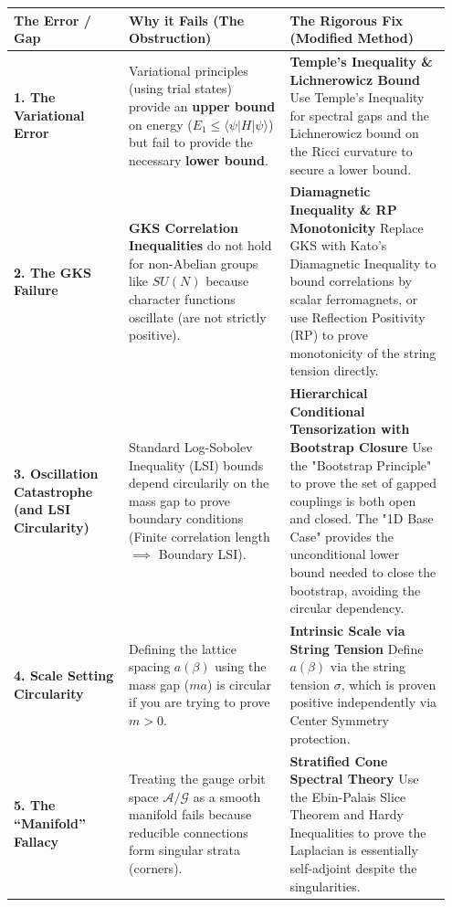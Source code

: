 \begin{center}
\begin{tabular}{|p{0.25\linewidth}|p{0.35\linewidth}|p{0.35\linewidth}|}
\hline
\textbf{The Error / Gap} & \textbf{Why it Fails (The Obstruction)} & \textbf{The Rigorous Fix (Modified Method)} \\
\hline
\textbf{1. The Variational Error} & Variational principles (using trial states) provide an \textbf{upper bound} on energy ($E_1 \le \langle \psi | H | \psi \rangle$) but fail to provide the necessary \textbf{lower bound}. & \textbf{Temple's Inequality \& Lichnerowicz Bound} \newline Use Temple's Inequality for spectral gaps and the Lichnerowicz bound on the Ricci curvature to secure a lower bound. \\
\hline
\textbf{2. The GKS Failure} & \textbf{GKS Correlation Inequalities} do not hold for non-Abelian groups like $SU(N)$ because character functions oscillate (are not strictly positive). & \textbf{Diamagnetic Inequality \& RP Monotonicity} \newline Replace GKS with Kato's Diamagnetic Inequality to bound correlations by scalar ferromagnets, or use Reflection Positivity (RP) to prove monotonicity of the string tension directly. \\
\hline
\textbf{3. Oscillation Catastrophe (and LSI Circularity)} & Standard Log-Sobolev Inequality (LSI) bounds depend circularily on the mass gap to prove boundary conditions (Finite correlation length $\implies$ Boundary LSI). & \textbf{Hierarchical Conditional Tensorization with Bootstrap Closure} \newline Use the "Bootstrap Principle" to prove the set of gapped couplings is both open and closed. The "1D Base Case" provides the unconditional lower bound needed to close the bootstrap, avoiding the circular dependency. \\
\hline
\textbf{4. Scale Setting Circularity} & Defining the lattice spacing $a(\beta)$ using the mass gap ($m a$) is circular if you are trying to prove $m > 0$. & \textbf{Intrinsic Scale via String Tension} \newline Define $a(\beta)$ via the string tension $\sigma$, which is proven positive independently via Center Symmetry protection. \\
\hline
\textbf{5. The ``Manifold'' Fallacy} & Treating the gauge orbit space $\mathcal{A}/\mathcal{G}$ as a smooth manifold fails because reducible connections form singular strata (corners). & \textbf{Stratified Cone Spectral Theory} \newline Use the Ebin-Palais Slice Theorem and Hardy Inequalities to prove the Laplacian is essentially self-adjoint despite the singularities. \\
\hline
\end{tabular}
\end{center}

